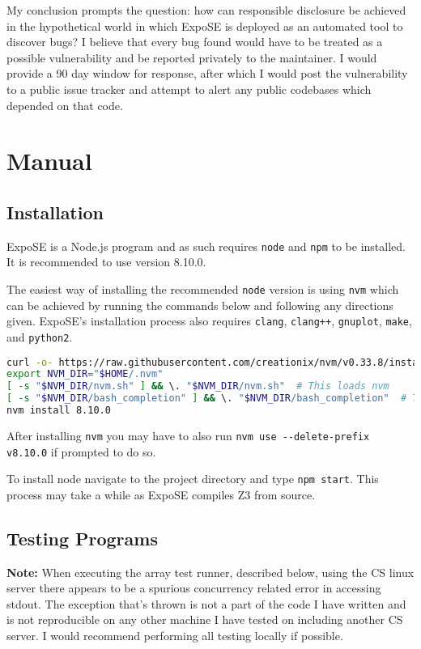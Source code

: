 \documentclass[]{final_report}
\begin{document}
My conclusion prompts the question: how can responsible disclosure be achieved in the hypothetical world in which ExpoSE is deployed as an automated tool to discover bugs? I believe that every bug found would have to be treated as a possible vulnerability and be reported privately to the maintainer. I would provide a 90 day window for response, after which I would post the vulnerability to a public issue tracker and attempt to alert any public codebases which depended on that code.

\section{Manual}

\subsection{Installation}
ExpoSE is a Node.js program and as such requires \lstinline|node| and \lstinline|npm| to be installed. It is recommended to use version 8.10.0. 

The easiest way of installing the recommended \lstinline|node| version is using \lstinline|nvm| which can be achieved by running the commands below and following any directions given. ExpoSE's installation process also requires \lstinline|clang|, \lstinline|clang++|, \lstinline|gnuplot|, \lstinline|make|, and \lstinline|python2|.
\begin{lstlisting}[language=Bash]
curl -o- https://raw.githubusercontent.com/creationix/nvm/v0.33.8/install.sh | bash
export NVM_DIR="$HOME/.nvm"
[ -s "$NVM_DIR/nvm.sh" ] && \. "$NVM_DIR/nvm.sh"  # This loads nvm
[ -s "$NVM_DIR/bash_completion" ] && \. "$NVM_DIR/bash_completion"  # This loads nvm bash_completion
nvm install 8.10.0
\end{lstlisting}

After installing \lstinline|nvm| you may have to also run \lstinline|nvm use --delete-prefix v8.10.0| if prompted to do so.

To install node navigate to the project directory and type \lstinline|npm start|. This process may take a while as ExpoSE compiles Z3 from source.

\subsection{Testing Programs}
\textbf{Note:} When executing the array test runner, described below, using the CS linux server there appears to be a spurious concurrency related error in accessing stdout. The exception that's thrown is not a part of the code I have written and is not reproducible on any other machine I have tested on including another CS server. I would recommend performing all testing locally if possible.
\end{document}
